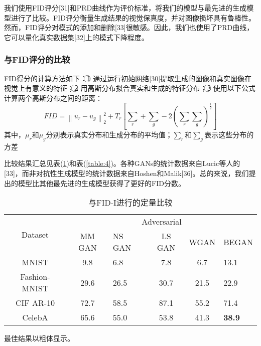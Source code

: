 我们使用FID评分[31]和PRD曲线作为评价标准，将我们的模型与最先进的生成模型进行了比较。FID评分衡量生成结果的视觉保真度，并对图像损坏具有鲁棒性。然而，FID评分对模式的添加和删除[33]很敏感。因此，我们也使用了PRD曲线，它可以量化真实数据集[32]上的模式下降程度。

\subsubsection{与FID评分的比较}

FID得分的计算方法如下：\textcircled{1} 通过运行初始网络[30]提取生成的图像和真实图像在视觉上有意义的特征；\textcircled{2} 用高斯分布拟合真实和生成的特征分布；\textcircled{3} 使用以下公式计算两个高斯分布之间的距离：
\begin{equation}
	FID = \left \| u_r - u_g \right \|_2^2 + T_r \left [ \sum_r + \sum_g - 2\left ( \sum_r \sum_g \right )^{\frac{1}{2} }  \right ] 
	\label{function:34}
\end{equation}
其中，$\mu _r$和$\mu _g$分别表示真实分布和生成分布的平均值；$\sum _r$和$\sum _g$表示这些分布的方差

比较结果汇总见表(\ref{table:3})和表(\ref{table:4})。各种GANs的统计数据来自Lucic等人的[33]，而非对抗性生成模型的统计数据来自Hoshen和Malik[36]。总的来说，我们提出的模型比其他最先进的生成模型获得了更好的FID分数。
\begin{table}[!htbp]
	\caption{与FID-I进行的定量比较}
	\label{table:3}
	\centering
	\begin{tabular}{@{}cclccl@{}}
		\toprule
		\multirow{2}{*}{Dataset} & \multicolumn{5}{c}{Adversarial}                 \\ \cmidrule(l){2-6} 
		& MM GAN & NS GAN & LS GAN & WGAN & BEGAN         \\ \cmidrule(r){1-6}
		MNIST                    & 9.8    & 6.8    & 7.8    & 6.7  & 13.1          \\
		Fashion-MNIST            & 29.6   & 26.5   & 30.7   & 21.5 & 22.9          \\
		CIF AR-10                & 72.7   & 58.5   & 87.1   & 55.2 & 71.4          \\
		CelebA                   & 65.6   & 55.0   & 53.8   & 41.3 & \textbf{38.9} \\ \bottomrule
	\end{tabular}
\end{table}

最佳结果以粗体显示。

